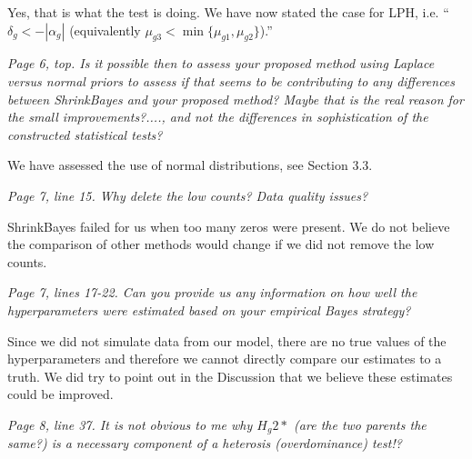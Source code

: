 \documentclass{article}
\newcommand{\comment}[1]{\textit{#1}}
\newcommand{\response}[1]{#1}
\newcommand{\todo}[1]{{\color{red} #1}}
\begin{document}
\response{Yes, that is what the test is doing. We have now stated the case for LPH, i.e. ``$\delta_g < -|\alpha_g|$ (equivalently $\mu_{g3} < \min\{\mu_{g1},\mu_{g2}\}$).''

\comment{Page 6, top.  Is it possible then to assess your proposed method using Laplace versus normal priors to assess if that seems to be contributing to any differences between ShrinkBayes and your proposed method?  Maybe that is the real reason for the small improvements?...., and not the differences in sophistication of the constructed statistical tests?}

\response{We have assessed the use of normal distributions, see Section 3.3.}

\comment{Page 7, line 15.  Why delete the low counts?  Data quality issues?}

\response{ShrinkBayes failed for us when too many zeros were present. We do not believe the comparison of other methods would change if we did not remove the low counts.}


\comment{Page 7, lines 17-22.  Can you provide us any information on how well the hyperparameters were estimated based on your empirical Bayes strategy?}

\response{Since we did not simulate data from our model, there are no true values of the hyperparameters and therefore we cannot directly compare our estimates to a truth.  We did try to point out in the Discussion that we believe these estimates could be improved.}

\comment{Page 8, line 37.  It is not obvious to me why $H_g2*$ (are the two parents the same?) is a necessary component of a heterosis (overdominance) test!?}

}
\end{document}
